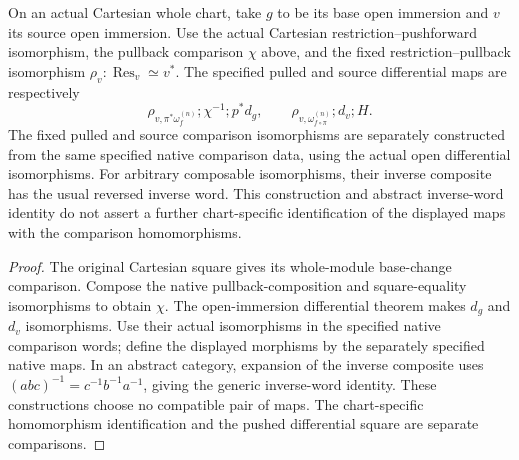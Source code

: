 \begin{definition}
\label{def:kn-native-restricted-differential-chart-data}
\leanok
On an actual Cartesian whole chart, take $g$ to be its base open
immersion and $v$ its source open immersion. Use the actual Cartesian
restriction--pushforward isomorphism, the pullback comparison $\chi$
above, and the fixed restriction--pullback isomorphism
$\rho_v:\operatorname{Res}_v\simeq v^*$.
The specified pulled and source differential maps are respectively
\[
 \rho_{v,\pi^*\omega_f^{(n)}};\chi^{-1};p^*d_g,
 \qquad
 \rho_{v,\omega_{f\circ\pi}^{(n)}};d_v;H.
\]
The fixed pulled and source comparison isomorphisms are separately
constructed from the same specified native comparison data, using the
actual open differential isomorphisms. For arbitrary composable
isomorphisms, their inverse composite has the usual reversed inverse
word. This construction and abstract inverse-word identity do not assert
a further chart-specific identification of the displayed maps with
the comparison homomorphisms.
\end{definition}
\begin{proof}
The original Cartesian square gives its whole-module base-change
comparison. Compose the native pullback-composition and square-equality
isomorphisms to obtain $\chi$. The open-immersion differential theorem
makes $d_g$ and $d_v$ isomorphisms. Use their actual isomorphisms in the
specified native comparison words; define the displayed morphisms by
the separately specified native maps. In an abstract category, expansion
of the inverse composite uses $(abc)^{-1}=c^{-1}b^{-1}a^{-1}$, giving the
generic inverse-word identity. These constructions choose no compatible
pair of maps. The chart-specific homomorphism identification and the
pushed differential square are separate comparisons.
\end{proof}

